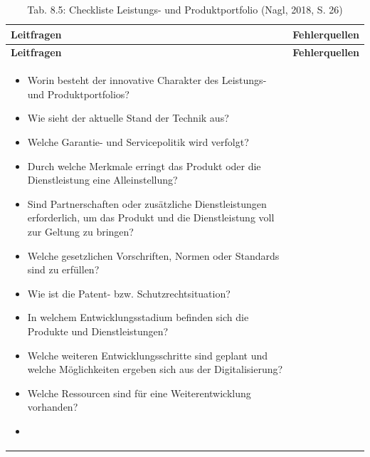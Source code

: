 \documentclass[
  letterpaper,
]{book}
\begin{document}
\begin{longtable}[]{@{}
  >{\raggedright\arraybackslash}p{}
  >{\raggedright\arraybackslash}p{}@{}}
\caption{Tab. 8.5: Checkliste Leistungs- und Produktportfolio (Nagl,
2018, S. 26)}\tabularnewline
\toprule\noalign{}
\begin{minipage}[b]{\linewidth}\raggedright
\textbf{Leitfragen}
\end{minipage} & \begin{minipage}[b]{\linewidth}\raggedright
\textbf{Fehlerquellen}
\end{minipage} \\
\midrule\noalign{}
\endfirsthead
\toprule\noalign{}
\begin{minipage}[b]{\linewidth}\raggedright
\textbf{Leitfragen}
\end{minipage} & \begin{minipage}[b]{\linewidth}\raggedright
\textbf{Fehlerquellen}
\end{minipage} \\
\midrule\noalign{}
\endhead
\bottomrule\noalign{}
\endlastfoot
\begin{minipage}[t]{\linewidth}\raggedright
\begin{itemize}
\item
  Worin besteht der innovative Charakter des Leistungs- und
  Produktportfolios?
\item
  Wie sieht der aktuelle Stand der Technik aus?
\item
  Welche Garantie- und Servicepolitik wird verfolgt?
\item
  Durch welche Merkmale erringt das Produkt oder die Dienstleistung eine
  Alleinstellung?
\item
  Sind Partnerschaften oder zusätzliche Dienstleistungen erforderlich,
  um das Produkt und die Dienstleistung voll zur Geltung zu bringen?
\item
  Welche gesetzlichen Vorschriften, Normen oder Standards sind zu
  erfüllen?
\item
  Wie ist die Patent- bzw. Schutzrechtsituation?
\item
  In welchem Entwicklungsstadium befinden sich die Produkte und
  Dienstleistungen?
\item
  Welche weiteren Entwicklungsschritte sind geplant und welche
  Möglichkeiten ergeben sich aus der Digitalisierung?
\item
  Welche Ressourcen sind für eine Weiterentwicklung vorhanden?
\item

\end{itemize}
\end{minipage}
\end{longtable}
\end{document}
